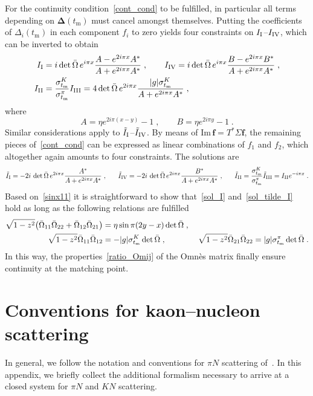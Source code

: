 \documentclass[11pt]{article}%
\providecommand{\ec}{\;,}
\providecommand{\ep}{\;.}
\providecommand{\nt}{\notag}
\newcommand{\tm}{t_\text{m}}
\newcommand{\ff}{\mathbf{f}}
\newcommand{\Del}{\boldsymbol{\Delta}}
\newcommand{\beq}{\begin{equation}}
\newcommand{\eeq}{\end{equation}}
\renewcommand{\Im}{\text{Im}\,}
\begin{document}
For the continuity condition~\eqref{cont_cond} to be fulfilled, in particular all terms depending on $\Del(\tm)$ must cancel amongst themselves. Putting the coefficients of $\Delta_i(\tm)$ in each component $f_i$ to zero yields four constraints on $I_{\rm I}$--$I_{\rm IV}$, which can be inverted to obtain
\begin{align}
\label{sol_I}
 I_{\rm I}&=i\det \bar\Omega\, e^{i\pi x}\frac{A-e^{2i\pi x}A^*}{A+e^{2i\pi x}A^*}\ec\qquad 
I_{\rm IV}=i\det \bar\Omega\, e^{i\pi x}\frac{B-e^{2i\pi x}B^*}{A+e^{2i\pi x}A^*}\ec\nt\\
I_{\rm II}&=\frac{\sigma_{\tm}^K}{\sigma_{\tm}^\pi}I_{\rm III}=4\det \bar\Omega\, e^{2i\pi x}\frac{|g|\sigma_{\tm}^K}{A+e^{2i\pi x}A^*}\ec
\end{align}
where
\beq
A=\eta e^{2i\pi(x-y)}-1\ec\qquad B=\eta e^{2i\pi y}-1\ep
\eeq
Similar considerations apply to $\tilde I_{\rm I}$--$\tilde I_{\rm IV}$. By means of $\Im \ff=T^*\Sigma \ff$, the remaining pieces of~\eqref{cont_cond} can be expressed as linear combinations of $f_1$ and $f_2$, which altogether again amounts to four constraints. The solutions are
\beq
\label{sol_tilde_I}
 \tilde I_{\rm I}=-2i\,\det \bar\Omega\, e^{2i\pi x}\frac{A^*}{A+e^{2i\pi x}A^*}\ec\qquad\!\! 
\tilde I_{\rm IV}=-2i\,\det \bar\Omega\, e^{2i\pi x}\frac{B^*}{A+e^{2i\pi x}A^*}\ec\qquad\!\!
\tilde I_{\rm II}=\frac{\sigma_{\tm}^K}{\sigma_{\tm}^\pi}\tilde I_{\rm III}=I_{\rm II}e^{-i\pi x}\ep
\eeq
Based on~\eqref{sinx11}
it is straightforward to show that~\eqref{sol_I} and~\eqref{sol_tilde_I} hold as long as the following relations are fulfilled
\begin{align}
\label{cont_conditions}
 \sqrt{1-z^2}\big(\bar\Omega_{11}\bar\Omega_{22}+\bar\Omega_{12}\bar\Omega_{21}\big)&=\eta\sin\pi(2y-x) \det\bar\Omega\ec\nt\\
\sqrt{1-z^2}\bar\Omega_{11}\bar\Omega_{12}&=-|g|\sigma_{\tm}^K\det\bar\Omega\ec\qquad\qquad \sqrt{1-z^2}\bar\Omega_{21}\bar\Omega_{22}=|g|\sigma_{\tm}^\pi\det\bar\Omega\ep
\end{align}
In this way, the properties~\eqref{ratio_Omij} of the Omn\`es matrix finally ensure continuity at the matching point.


\section{Conventions for kaon--nucleon scattering}
\label{app:KN}

In general, we follow the notation and conventions for $\pi N$ scattering of~\cite{RS_DHKM}. In this appendix, we briefly collect the additional formalism necessary to arrive at a closed system for $\pi N$ and $K N$ scattering.
\end{document}
